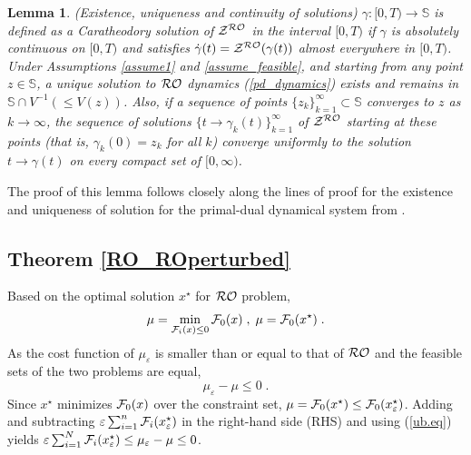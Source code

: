 \documentclass[journal,twoside,web]{ieeecolor}
\newtheorem{lemma}{Lemma}
\begin{document}
\begin{lemma} \label{uniq_exis}
(Existence, uniqueness and continuity of solutions)
$\gamma:[0,T) \rightarrow {\mathbb S}$ is defined as a Caratheodory solution of ${\cal Z}^{\cal RO}$ in the interval $[0,T)$ if $\gamma$ is absolutely continuous on $[0,T)$ and satisfies $\dot \gamma(t)={\cal Z}^{\cal RO} (\gamma(t))$ almost everywhere in $[0,T)$.
Under Assumptions \ref{assume1} and \ref{assume_feasible}, and starting from any point $z\in \mathbb S$, a unique solution to ${\cal RO}$ dynamics (\ref{pd_dynamics}) exists and remains in $\mathbb S \cap V^{-1}(\leq V(z))$. Also, if a sequence of points $\{z_k\}_{k=1}^\infty \subset {\mathbb S}$ converges to $z$ as $k \rightarrow \infty$, the sequence of solutions $\{t \rightarrow \gamma_k(t)\}_{k=1}^\infty$ of ${\cal Z}^{\cal RO}$ starting at these points (that is, $\gamma_k(0)=z_k$ for all $k$) converge uniformly to the solution $t \rightarrow \gamma(t)$ on every compact set of $[0,\infty)$.
\end{lemma}
The proof of this lemma follows closely along the lines of proof for the existence and uniqueness of solution for the primal-dual dynamical system from \cite[Lemma~4.3]{cherukuri2016}.


\subsection{Theorem \ref{RO_ROperturbed}}

Based on the optimal solution $x^\star$ for ${\cal RO}$ problem,
\begin{align*}
\mu=\min_{{\cal F}_i(x)\leq  0} {\cal F}_0(x)\;,\; \mu={\cal F}_0(x^\star)\;.
\end{align*}
As the cost function of $\mu_\varepsilon$ is smaller than or equal to that of ${\cal RO}$ and the feasible sets of the two problems are equal,
\begin{equation}\label{ub.eq}
 \mu_\varepsilon-\mu\leq 0\;.
\end{equation}
Since $x^\star$ minimizes ${\cal F}_0(x)$ over the constraint set, $\mu={\cal F}_0(x^\star)\leq {\cal F}_0(x_\varepsilon^\star)$.
Adding and subtracting $\varepsilon\sum_{i=1}^n{\cal F}_i(x^\star_\varepsilon)$
in the right-hand side (RHS) and using (\ref{ub.eq}) yields $\varepsilon \sum_{i=1}^N{\cal F}_{i}(x_\varepsilon^\star)\leq
\mu_\varepsilon-\mu\leq 0$\;.
\end{document}
